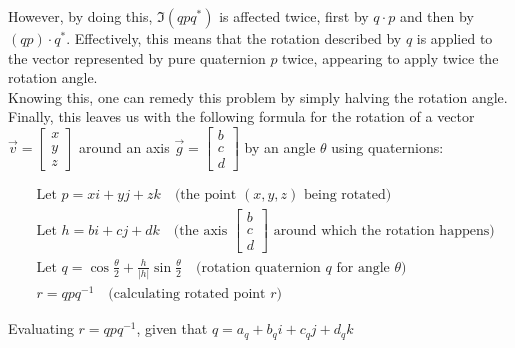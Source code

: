 \documentclass[12pt, a4paper]{article}
\begin{document}
However, by doing this, $\Im(qpq^*)$ is affected twice, first by $q \cdot p$ and
then by $(qp) \cdot q^*$. Effectively, this means that the rotation described by
$q$ is applied to the vector represented by pure quaternion $p$ twice, appearing
to apply twice the rotation angle. \\

Knowing this, one can remedy this problem by simply halving the rotation angle.
Finally, this leaves us with the following formula for the rotation of a vector
$\vec{v} = \begin{bmatrix} x \\
    y \\
    z
\end{bmatrix}$ around an axis $\vec{g} = \begin{bmatrix}
    b \\
    c \\
    d
\end{bmatrix}$ by an angle $\theta$ using quaternions:

\begin{align*}
    &\text{Let } p = xi + yj + zk \quad \text{(the point $(x, y, z)$ being rotated)}\\
    &\text{Let } h = bi + cj + dk \quad \text{(the axis $\begin{bmatrix}b \\ c \\ d\end{bmatrix}$ around which the rotation happens)} \\
    &\text{Let } q = \cos\frac{\theta}{2} + \frac{h}{|h|}\sin\frac{\theta}{2} \quad \text{(rotation quaternion $q$ for angle $\theta$)}\\
    &r = qpq^{-1} \quad \text{(calculating rotated point $r$)}
\end{align*}

Evaluating $r = qpq^{-1}$, given that $q = a_q + b_qi + c_qj + d_qk$
\end{document}
